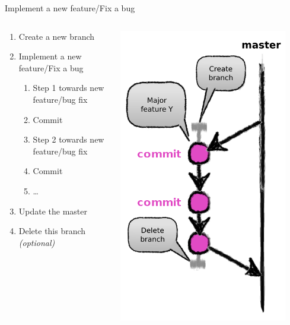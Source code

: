\begin{frame}[fragile]{Implement a new feature/Fix a bug}
\begin{columns}
	\begin{column}{0.6\textwidth}
	\small
	\begin{enumerate}
		\item Create a new branch
		\item Implement a new feature/Fix a bug
		\begin{enumerate}
			\tiny
			\item Step 1 towards new feature/bug fix
			\item Commit
			\item Step 2 towards new feature/bug fix
			\item Commit
			\item \ldots
		\end{enumerate}
		\item Update the master
		\item Delete this branch \textit{(optional)} 
	\end{enumerate}
	\end{column}
	\begin{column}{0.4\textwidth}
		\begin{center}
			\includegraphics[width=0.9\textwidth]{branch.png}

\end{center}
\end{column}
\end{columns}
\end{frame}
